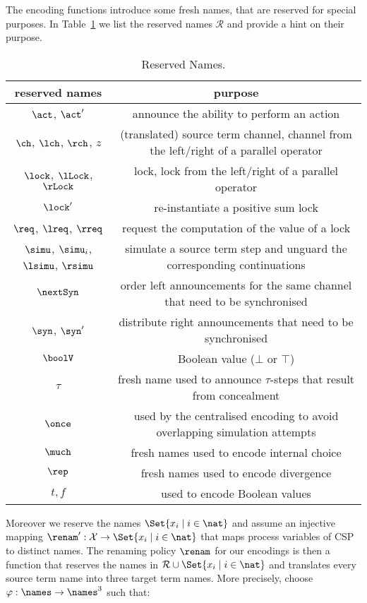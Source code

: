 \documentclass[]{eptcs}
\begin{document}
The encoding functions introduce some fresh names, that are reserved for special purposes. In Table~\ref{tab:resNam} we list the reserved names $ \mathcal{R} $ and provide a hint on their purpose.
\begin{table}[t]
	\begin{tabular}{|c|c|}
		\hline
		reserved names & purpose\\
		\hline
		$ \act $, $ \act' $ & announce the ability to perform an action\\
		$ \ch $, $ \lch $, $ \rch $, $ z $ & (translated) source term channel, channel from the left/right of a parallel operator\\
		$ \lock $, $ \lLock $, $ \rLock $ & lock, lock from the left/right of a parallel operator\\
		$ \lock' $ & re-instantiate a positive sum lock\\
		$ \req $, $ \lreq $, $ \rreq $ & request the computation of the value of a lock\\
		$ \simu $, $ \simu_i $, $ \lsimu $, $ \rsimu $ & simulate a source term step and unguard the corresponding continuations\\
		$ \nextSyn $ & order left announcements for the same channel that need to be synchronised\\
		$ \syn $, $ \syn' $ & distribute right announcements that need to be synchronised\\
		$ \boolV $ & Boolean value ($ \bot $ or $ \top $)\\
		$ \tau $ & fresh name used to announce $ \tau $-steps that result from concealment\\
		$ \once $ & used by the centralised encoding to avoid overlapping simulation attempts\\
		$ \much $ & fresh names used to encode internal choice\\
		$ \rep $ & fresh names used to encode divergence\\
		$ t, f $ & used to encode Boolean values\\
		\hline
	\end{tabular}
	\caption{Reserved Names.}
	\label{tab:resNam}
\end{table}
Moreover we reserve the names $ \Set{ x_i \mid i \in \nat } $ and assume an injective mapping $ \renam': \mathcal{X} \to \Set{ x_i \mid i \in \nat } $ that maps process variables of CSP to distinct names.
The renaming policy $ \renam $ for our encodings is then a function that reserves the names in $ \mathcal{R} \cup \Set{ x_i \mid i \in \nat } $ and translates every source term name into three target term names. More precisely, choose $ \varphi : \names \to \names^3 $ such that:
\end{document}
